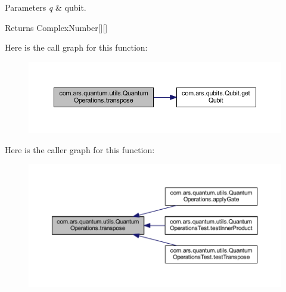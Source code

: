 \begin{DoxyParams}{Parameters}
{\em q} & qubit. \\
\hline
\end{DoxyParams}
\begin{DoxyReturn}{Returns}
Complex\+Number\mbox{[}\mbox{]}\mbox{[}\mbox{]} 
\end{DoxyReturn}
Here is the call graph for this function\+:
\nopagebreak
\begin{figure}[H]
\begin{center}
\leavevmode
\includegraphics[width=350pt]{classcom_1_1ars_1_1quantum_1_1utils_1_1_quantum_operations_aa93536fa306fcff162cc9cbde2f89356_cgraph}
\end{center}
\end{figure}
Here is the caller graph for this function\+:
\nopagebreak
\begin{figure}[H]
\begin{center}
\leavevmode
\includegraphics[width=350pt]{classcom_1_1ars_1_1quantum_1_1utils_1_1_quantum_operations_aa93536fa306fcff162cc9cbde2f89356_icgraph}
\end{center}
\end{figure}
\hypertarget{classcom_1_1ars_1_1quantum_1_1utils_1_1_quantum_operations_af44db7c95ae6bda08cb865e46bf19eff}{}\label{classcom_1_1ars_1_1quantum_1_1utils_1_1_quantum_operations_af44db7c95ae6bda08cb865e46bf19eff} 

